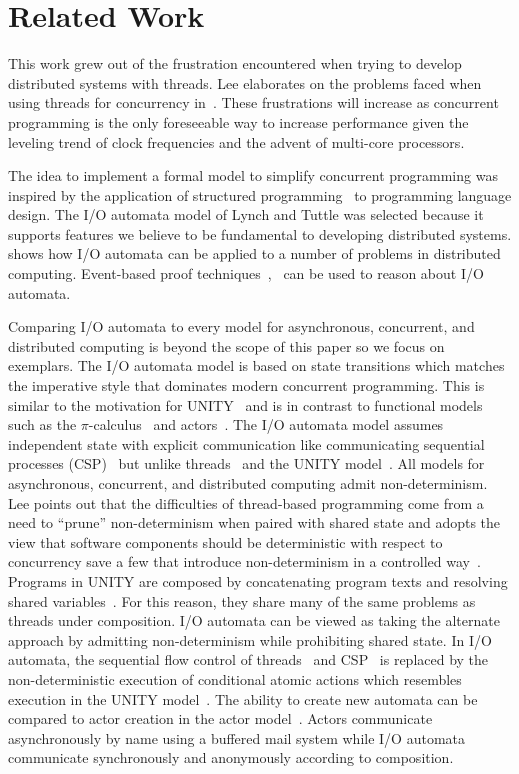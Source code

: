 \section{Related Work\label{related_work}}

This work grew out of the frustration encountered when trying to develop distributed systems with threads.
Lee elaborates on the problems faced when using threads for concurrency in~\cite{lee2006problem}.
These frustrations will increase as concurrent programming is the only foreseeable way to increase performance given the leveling trend of clock frequencies and the advent of multi-core processors\cite{sutter2005software}.

The idea to implement a formal model to simplify concurrent programming was inspired by the application of structured programming~\cite{dijkstra1968letters} to programming language design.
The I/O automata model of Lynch and Tuttle\cite{lynch1987hierarchical} was selected because it supports features we believe to be fundamental to developing distributed systems.
\cite{lynch1996distributed} shows how I/O automata can be applied to a number of problems in distributed computing.
Event-based proof techniques~\cite{manna1992temporal},~\cite{lamport1978time} can be used to reason about I/O automata.

Comparing I/O automata to every model for asynchronous, concurrent, and distributed computing is beyond the scope of this paper so we focus on exemplars.
The I/O automata model is based on state transitions which matches the imperative style that dominates modern concurrent programming.
This is similar to the motivation for UNITY~\cite{chandy1988parallel} and is in contrast to functional models such as the $\pi$-calculus~\cite{milner1992calculus} and actors~\cite{agha1986actors}.
The I/O automata model assumes independent state with explicit communication like communicating sequential processes (CSP)~\cite{hoare1978communicating} but unlike threads~\cite{lee2006problem} and the UNITY model~\cite{chandy1988parallel}.
All models for asynchronous, concurrent, and distributed computing admit non-determinism.
Lee points out that the difficulties of thread-based programming come from a need to ``prune'' non-determinism when paired with shared state and adopts the view that software components should be deterministic with respect to concurrency save a few that introduce non-determinism in a controlled way~\cite{lee2006problem}.
Programs in UNITY are composed by concatenating program texts and resolving shared variables~\cite{chandy1988parallel}.
For this reason, they share many of the same problems as threads under composition.
I/O automata can be viewed as taking the alternate approach by admitting non-determinism while prohibiting shared state.
In I/O automata, the sequential flow control of threads~\cite{lee2006problem} and CSP~\cite{hoare1978communicating} is replaced by the non-deterministic execution of conditional atomic actions which resembles execution in the UNITY model~\cite{chandy1988parallel}.
The ability to create new automata can be compared to actor creation in the actor model~\cite{agha1986actors}.
Actors communicate asynchronously by name using a buffered mail system while I/O automata communicate synchronously and anonymously according to composition.

